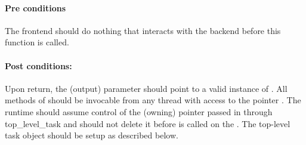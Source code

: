 \paragraph{Pre conditions} The frontend should do nothing that interacts with the backend before this
   function is called.
 
\paragraph{Post conditions:} Upon return, the (output) parameter  should point to  a valid
   instance of .  All methods of  should be invocable
   from any thread with access to the pointer .  The runtime should assume
   control of the (owning) pointer passed in through top\_level\_task and should not delete
   it before  is called on the .  The top-level
   task object should be setup as described below.
 
